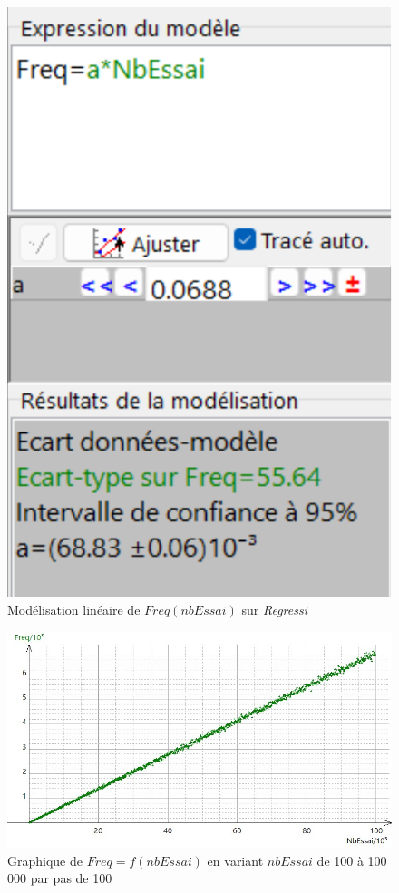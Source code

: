 \documentclass{report}
\begin{document}
\begin{figure}[H]
	\centering
	\includegraphics[scale=0.5]{../graphe/valDeP3CR2L.png}
	\caption{Modélisation linéaire de $Freq(nbEssai)$ sur \textit{Regressi}}
\end{figure}

\begin{figure}[H]
	\includegraphics[width=\textwidth]{../graphe/Freq3CR2L(n).jpg}
	\caption{Graphique de $Freq=f(nbEssai)$ en variant $nbEssai$ de 100 à 100 000 par pas de 100}
\end{figure}	
\end{document}
